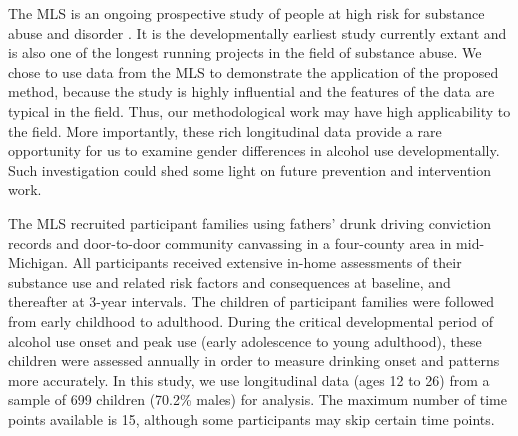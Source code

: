 The MLS is an ongoing prospective study of people at high risk for
substance abuse and disorder \cite{zucker96}. It is the
developmentally earliest study currently extant and is also one of
the longest running projects in the field of substance abuse. We
chose to use data from the MLS to demonstrate the application of
the proposed method, because the study is highly influential and
the features of the data are typical in the field. Thus, our
methodological work may have high applicability to the field. More
importantly, these rich longitudinal data provide a rare
opportunity for us to examine gender differences in alcohol use
developmentally. Such investigation could shed some light on
future prevention and intervention work.

The MLS recruited participant families using fathers' drunk
driving conviction records and door-to-door community canvassing
in a four-county area in mid-Michigan. All participants received
extensive in-home assessments of their substance use and related
risk factors and consequences at baseline, and thereafter at
3-year intervals. The children of participant families were
followed from early childhood to adulthood. During the critical
developmental period of alcohol use onset and peak use (early
adolescence to young adulthood), these children were assessed
annually in order to measure drinking onset and patterns more
accurately. In this study, we use longitudinal data (ages 12 to
26) from a sample of 699 children (70.2\% males) for analysis. The
maximum number of time points available is 15, although some
participants may skip certain time points.


